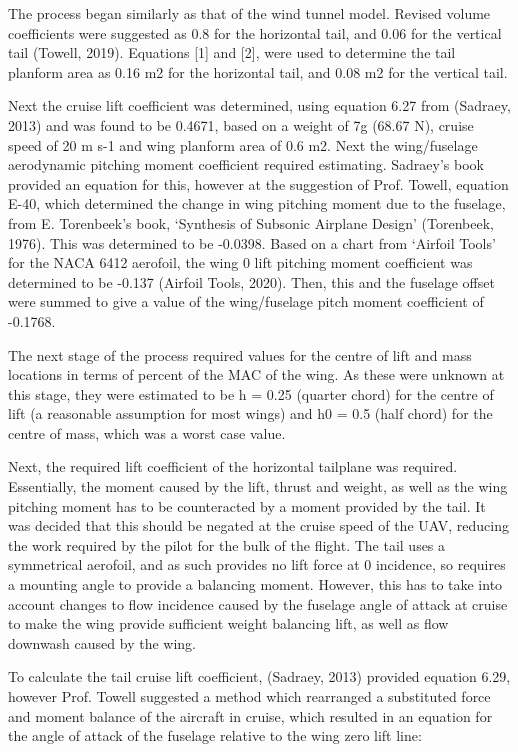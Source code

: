 \documentclass[../../main.tex]{subfiles}
\begin{document}
The process began similarly as that of the wind tunnel model.
Revised volume coefficients were suggested as 0.8 for the horizontal tail, and 0.06 for the vertical tail (Towell, 2019).
Equations [1] and [2], were used to determine the tail planform area as 0.16 m2 for the horizontal tail, and 0.08 m2 for the vertical tail.  

Next the cruise lift coefficient was determined, using equation 6.27 from (Sadraey, 2013) and was found to be 0.4671, based on a weight of 7g (68.67 N), cruise speed of 20 m s-1 and wing planform area of 0.6 m2.
Next the wing/fuselage aerodynamic pitching moment coefficient required estimating.
Sadraey’s book provided an equation for this, however at the suggestion of Prof. Towell, equation E-40, which determined the change in wing pitching moment due to the fuselage, from E. Torenbeek’s book, ‘Synthesis of Subsonic Airplane Design’ (Torenbeek, 1976).
This was determined to be -0.0398.
Based on a chart from ‘Airfoil Tools’ for the NACA 6412 aerofoil, the wing 0 lift pitching moment coefficient was determined to be -0.137 (Airfoil Tools, 2020).
Then, this and the fuselage offset were summed to give a value of the wing/fuselage pitch moment coefficient of -0.1768. 

The next stage of the process required values for the centre of lift and mass locations in terms of percent of the MAC of the wing.
As these were unknown at this stage, they were estimated to be h = 0.25 (quarter chord) for the centre of lift (a reasonable assumption for most wings) and h0 = 0.5 (half chord) for the centre of mass, which was a worst case value. 

Next, the required lift coefficient of the horizontal tailplane was required.
Essentially, the moment caused by the lift, thrust and weight, as well as the wing pitching moment has to be counteracted by a moment provided by the tail.
It was decided that this should be negated at the cruise speed of the UAV, reducing the work required by the pilot for the bulk of the flight.
The tail uses a symmetrical aerofoil, and as such provides no lift force at 0 incidence, so requires a mounting angle to provide a balancing moment.
However, this has to take into account changes to flow incidence caused by the fuselage angle of attack at cruise to make the wing provide sufficient weight balancing lift, as well as flow downwash caused by the wing. 

To calculate the tail cruise lift coefficient, (Sadraey, 2013) provided equation 6.29, however Prof. Towell suggested a method which rearranged a substituted force and moment balance of the aircraft in cruise, which resulted in an equation for the angle of attack of the fuselage relative to the wing zero lift line: 
\end{document}
